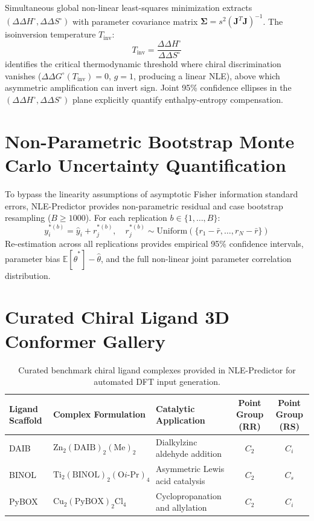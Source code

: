 \documentclass[11pt,a4paper]{article}
\begin{document}
Simultaneous global non-linear least-squares minimization extracts $(\Delta\Delta H^\circ, \Delta\Delta S^\circ)$ with parameter covariance matrix $\mathbf{\Sigma} = s^2 (\mathbf{J}^T \mathbf{J})^{-1}$. The isoinversion temperature $T_{\text{inv}}$:
\begin{equation}
T_{\text{inv}} = \frac{\Delta\Delta H^\circ}{\Delta\Delta S^\circ}
\end{equation}
identifies the critical thermodynamic threshold where chiral discrimination vanishes ($\Delta\Delta G^\circ(T_{\text{inv}}) = 0$, $g = 1$, producing a linear NLE), above which asymmetric amplification can invert sign. Joint 95\% confidence ellipses in the $(\Delta\Delta H^\circ, \Delta\Delta S^\circ)$ plane explicitly quantify enthalpy-entropy compensation.

\section{Non-Parametric Bootstrap Monte Carlo Uncertainty Quantification}

To bypass the linearity assumptions of asymptotic Fisher information standard errors, NLE-Predictor provides non-parametric residual and case bootstrap resampling ($B \ge 1000$). For each replication $b \in \{1, \dots, B\}$:
\begin{equation}
y_i^{*(b)} = \hat{y}_i + r_j^{*(b)}, \quad r_j^{*(b)} \sim \text{Uniform}(\{r_1 - \bar{r}, \dots, r_N - \bar{r}\})
\end{equation}
Re-estimation across all replications provides empirical 95\% confidence intervals, parameter bias $\mathbb{E}[\hat{\theta}^*] - \hat{\theta}$, and the full non-linear joint parameter correlation distribution.

\section{Curated Chiral Ligand 3D Conformer Gallery}

\begin{table}[htbp]
\centering
\caption{Curated benchmark chiral ligand complexes provided in NLE-Predictor for automated DFT input generation.}
\label{tab:gallery}
\begin{tabular}{lllcc}
\toprule
\textbf{Ligand Scaffold} & \textbf{Complex Formulation} & \textbf{Catalytic Application} & \textbf{Point Group (RR)} & \textbf{Point Group (RS)} \\
\midrule
DAIB  & $\text{Zn}_2(\text{DAIB})_2(\text{Me})_2$ & Dialkylzinc aldehyde addition & $C_2$ & $C_i$ \\
BINOL & $\text{Ti}_2(\text{BINOL})_2(\text{O}i\text{-Pr})_4$ & Asymmetric Lewis acid catalysis & $C_2$ & $C_s$ \\
PyBOX & $\text{Cu}_2(\text{PyBOX})_2\text{Cl}_4$ & Cyclopropanation and allylation & $C_2$ & $C_i$ \\
\bottomrule
\end{tabular}
\end{table}



\end{document}
